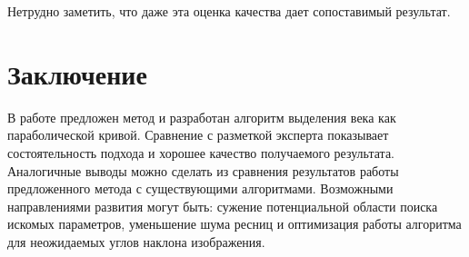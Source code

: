 \documentclass[12pt,a4paper]{article} %
\begin{document}
Нетрудно заметить, что даже эта оценка качества дает сопоставимый результат.


\newpage
\section{Заключение}

В работе предложен метод и разработан алгоритм выделения века как параболической кривой. Сравнение с разметкой эксперта показывает состоятельность подхода и хорошее качество получаемого результата. Аналогичные выводы можно сделать из сравнения результатов работы предложенного метода с существующими алгоритмами. Возможными направлениями развития могут быть: сужение потенциальной области поиска искомых параметров, уменьшение шума ресниц и оптимизация работы алгоритма для неожидаемых углов наклона изображения.



\newpage



\nocite{GV}
\end{document}
